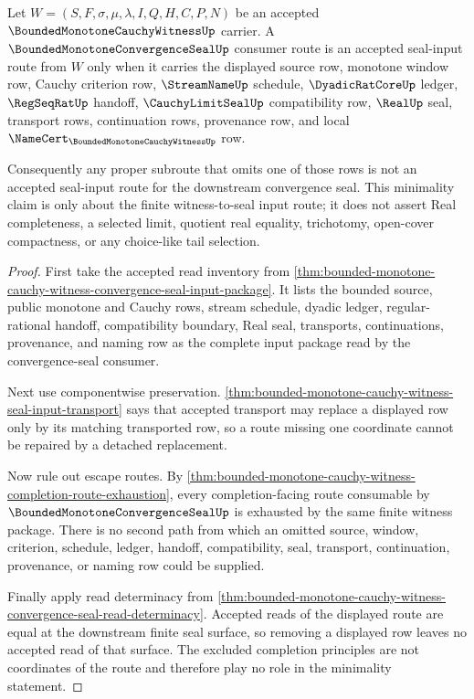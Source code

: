 \begin{theorem}
\label{thm:bounded-monotone-cauchy-witness-seal-route-minimality}
Let $W=(S,F,\sigma,\mu,\lambda,I,Q,H,C,P,N)$ be an accepted $\BoundedMonotoneCauchyWitnessUp$ carrier. A $\BoundedMonotoneConvergenceSealUp$ consumer route is an accepted seal-input route from $W$ only when it carries the displayed source row, monotone window row, Cauchy criterion row, $\StreamNameUp$ schedule, $\DyadicRatCoreUp$ ledger, $\RegSeqRatUp$ handoff, $\CauchyLimitSealUp$ compatibility row, $\RealUp$ seal, transport rows, continuation rows, provenance row, and local $\NameCert_{\BoundedMonotoneCauchyWitnessUp}$ row.

Consequently any proper subroute that omits one of those rows is not an accepted seal-input route for the downstream convergence seal. This minimality claim is only about the finite witness-to-seal input route; it does not assert Real completeness, a selected limit, quotient real equality, trichotomy, open-cover compactness, or any choice-like tail selection.
\end{theorem}
\begin{proof}
First take the accepted read inventory from \autoref{thm:bounded-monotone-cauchy-witness-convergence-seal-input-package}. It lists the bounded source, public monotone and Cauchy rows, stream schedule, dyadic ledger, regular-rational handoff, compatibility boundary, Real seal, transports, continuations, provenance, and naming row as the complete input package read by the convergence-seal consumer.

Next use componentwise preservation. \autoref{thm:bounded-monotone-cauchy-witness-seal-input-transport} says that accepted transport may replace a displayed row only by its matching transported row, so a route missing one coordinate cannot be repaired by a detached replacement.

Now rule out escape routes. By \autoref{thm:bounded-monotone-cauchy-witness-completion-route-exhaustion}, every completion-facing route consumable by $\BoundedMonotoneConvergenceSealUp$ is exhausted by the same finite witness package. There is no second path from which an omitted source, window, criterion, schedule, ledger, handoff, compatibility, seal, transport, continuation, provenance, or naming row could be supplied.

Finally apply read determinacy from \autoref{thm:bounded-monotone-cauchy-witness-convergence-seal-read-determinacy}. Accepted reads of the displayed route are equal at the downstream finite seal surface, so removing a displayed row leaves no accepted read of that surface. The excluded completion principles are not coordinates of the route and therefore play no role in the minimality statement.
\end{proof}

